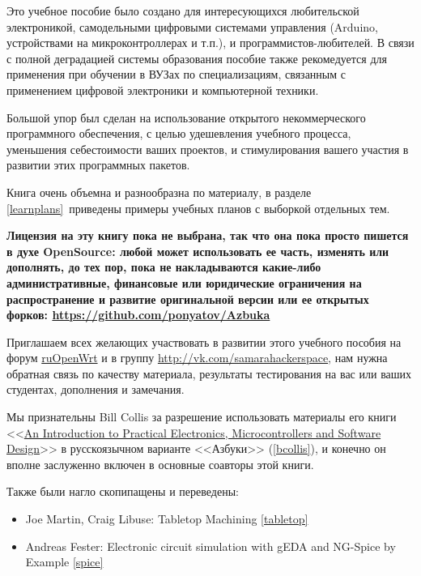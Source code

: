
Это учебное пособие было создано для интересующихся любительской электроникой,
самодельными цифровыми системами управления (Arduino, устройствами на
микроконтроллерах и т.п.), и программистов-любителей. В связи с полной
деградацией системы образования пособие также рекомедуется для применения при
обучении в ВУЗах по специализациям, связанным с применением цифровой электроники
и компьютерной техники.

Большой упор был сделан на использование открытого некоммерческого программного
обеспечения, с целью удешевления учебного процесса, уменьшения себестоимости
ваших проектов, и стимулирования вашего участия в развитии этих программных пакетов.

Книга очень объемна и разнообразна по материалу, в разделе \ref{learnplans}\
приведены примеры учебных планов с выборкой отдельных тем.

\bigskip
\textbf{Лицензия на эту книгу пока не выбрана, так что она пока просто пишется в
духе OpenSource: любой может использовать ее часть, изменять или дополнять, до
тех пор, пока не накладываются какие-либо административные, финансовые или
юридические ограничения на распространение и развитие оригинальной версии или ее
открытых форков: \url{https://github.com/ponyatov/Azbuka}}
\bigskip

Приглашаем всех желающих участвовать в развитии этого учебного пособия на форум
\href{https://groups.google.com/forum/\#!forum/openwrt2ru}{ruOpenWrt} и в группу
\url{http://vk.com/samarahackerspace}, нам нужна обратная связь по качеству
материала, результаты тестирования на вас или ваших студентах, дополнения и
замечания.
\bigskip

Мы признательны Bill Collis за разрешение использовать материалы его книги
<<\href{www.techideas.co.nz}{An Introduction to
Practical Electronics,
Microcontrollers and
Software Design}>>\cite{bcollis} в
русскоязычном варианте <<Азбуки>> (\ref{bcollis}), и конечно он вполне
заслуженно включен в основные соавторы этой книги.

\bigskip
Также были нагло скопипащены и переведены:
\begin{itemize}
  \item Joe Martin, Craig Libuse: Tabletop Machining \ref{tabletop}
  \item Andreas Fester: Electronic circuit simulation with gEDA and NG-Spice by
Example \ref{spice}
\end{itemize}
